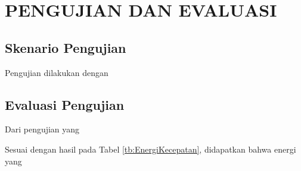 \chapter{PENGUJIAN DAN EVALUASI}


\section{Skenario Pengujian}

Pengujian dilakukan dengan \lipsum[24]

\section{Evaluasi Pengujian}

Dari pengujian yang \lipsum[25][1-10]



Sesuai dengan hasil pada Tabel \ref{tb:EnergiKecepatan}, didapatkan bahwa energi yang \lipsum[26]
